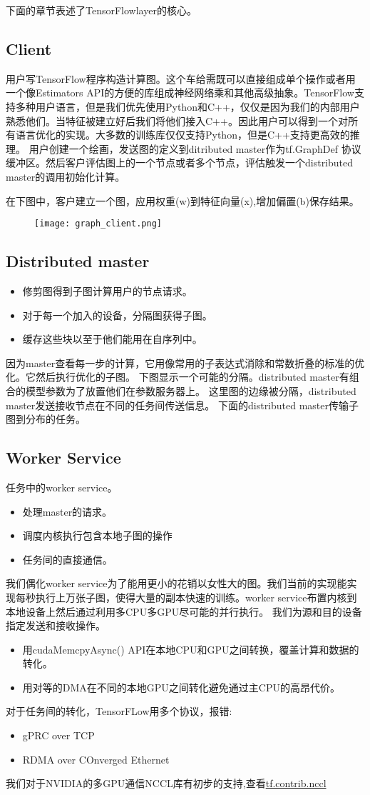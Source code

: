 下面的章节表述了TensorFlowlayer的核心。
\subsection{Client}
用户写TensorFlow程序构造计算图。这个车给需既可以直接组成单个操作或者用一个像Estimators API的方便的库组成神经网络乘和其他高级抽象。TensorFlow支持多种用户语言，但是我们优先使用Python和C++，仅仅是因为我们的内部用户熟悉他们。当特征被建立好后我们将他们接入C++。因此用户可以得到一个对所有语言优化的实现。大多数的训练库仅仅支持Python，但是C++支持更高效的推理。
用户创建一个绘画，发送图的定义到ditributed master作为tf.GraphDef 协议缓冲区。然后客户评估图上的一个节点或者多个节点，评估触发一个distributed master的调用初始化计算。

在下图中，客户建立一个图，应用权重(w)到特征向量(x),增加偏置(b)保存结果。
\begin{figure}[h]
\texttt{[image: graph\_client.png]}
\end{figure}
\subsection{Distributed master}
\begin{itemize}
\item 修剪图得到子图计算用户的节点请求。
\item 对于每一个加入的设备，分隔图获得子图。
\item 缓存这些块以至于他们能用在自序列中。
\end{itemize}
因为master查看每一步的计算，它用像常用的子表达式消除和常数折叠的标准的优化。它然后执行优化的子图。
下图显示一个可能的分隔。distributed master有组合的模型参数为了放置他们在参数服务器上。
这里图的边缘被分隔，distributed master发送接收节点在不同的任务间传送信息。
下面的distributed master传输子图到分布的任务。
\subsection{Worker Service}
任务中的worker service。
\begin{itemize}
\item 处理master的请求。
\item 调度内核执行包含本地子图的操作
\item 任务间的直接通信。
\end{itemize}
我们偶化worker service为了能用更小的花销以女性大的图。我们当前的实现能实现每秒执行上万张子图，使得大量的副本快速的训练。worker service布置内核到本地设备上然后通过利用多CPU多GPU尽可能的并行执行。
我们为源和目的设备指定发送和接收操作。
\begin{itemize}
\item 用cudaMemcpyAsync() API在本地CPU和GPU之间转换，覆盖计算和数据的转化。
\item 用对等的DMA在不同的本地GPU之间转化避免通过主CPU的高昂代价。
\end{itemize}
对于任务间的转化，TensorFLow用多个协议，报错:
\begin{itemize}
\item gPRC over TCP
\item RDMA over COnverged Ethernet
\end{itemize}
我们对于NVIDIA的多GPU通信NCCL库有初步的支持,查看\href{}{tf.contrib.nccl}
